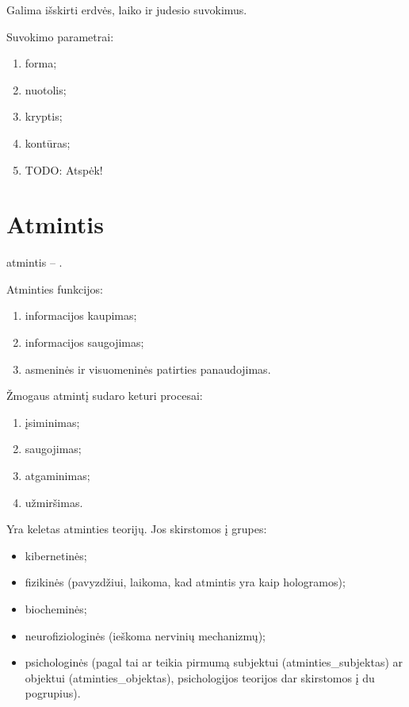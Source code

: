 Galima išskirti erdvės, laiko ir judesio suvokimus.


Suvokimo parametrai:

\begin{enumerate}
  \item forma;
  \item nuotolis;
  \item kryptis;
  \item kontūras;
  \item TODO: Atspėk!
\end{enumerate}

\section{Atmintis}

\label{tema:atmintis}

\Gls{atmintis} – .

Atminties funkcijos:

\begin{enumerate}
  \item informacijos kaupimas;
  \item informacijos saugojimas;
  \item asmeninės ir visuomeninės patirties panaudojimas.
\end{enumerate}

Žmogaus atmintį sudaro keturi procesai:

\begin{enumerate}
  \item įsiminimas;
  \item saugojimas;
  \item atgaminimas;
  \item užmiršimas.
\end{enumerate}

Yra keletas atminties teorijų. Jos skirstomos į grupes:

\begin{itemize}
  \item kibernetinės;
  \item fizikinės (pavyzdžiui, laikoma, kad atmintis yra kaip hologramos);
  \item biocheminės;
  \item neurofiziologinės (ieškoma nervinių mechanizmų);
  \item psichologinės (pagal tai ar teikia pirmumą subjektui 
    (\gls{atminties_subjektas}) ar objektui (\gls{atminties_objektas}),
    psichologijos teorijos dar skirstomos į du pogrupius).
\end{itemize}

